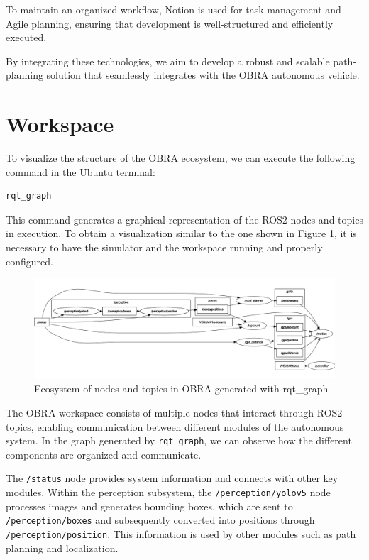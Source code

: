 \documentclass[a4paper,11pt]{report}
\begin{document}
To maintain an organized workflow, Notion is used for task management and Agile planning, ensuring that development is well-structured and efficiently executed.

By integrating these technologies, we aim to develop a robust and scalable path-planning solution that seamlessly integrates with the OBRA autonomous vehicle.

\section{Workspace}

To visualize the structure of the OBRA ecosystem, we can execute the following command in the Ubuntu terminal:

\begin{verbatim}
rqt_graph
\end{verbatim}

This command generates a graphical representation of the ROS2 nodes and topics in execution. To obtain a visualization similar to the one shown in Figure \ref{fig:obra_graph}, it is necessary to have the simulator and the workspace running and properly configured.

\begin{figure}[h]
    \centering
    \includegraphics[width=\textwidth]{Images/wsgraph.png}
    \caption{Ecosystem of nodes and topics in OBRA generated with rqt\_graph}
    \label{fig:obra_graph}
\end{figure}

The OBRA workspace consists of multiple nodes that interact through ROS2 topics, enabling communication between different modules of the autonomous system. In the graph generated by \texttt{rqt\_graph}, we can observe how the different components are organized and communicate.

The \texttt{/status} node provides system information and connects with other key modules. Within the perception subsystem, the \texttt{/perception/yolov5} node processes images and generates bounding boxes, which are sent to \texttt{/perception/boxes} and subsequently converted into positions through \texttt{/perception/position}. This information is used by other modules such as path planning and localization.
\end{document}
